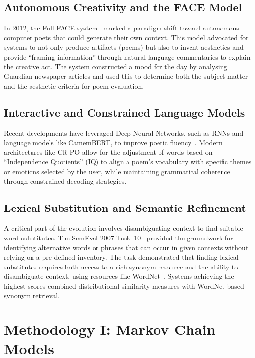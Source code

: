 \documentclass[conference]{IEEEtran}
\begin{document}
\subsection{Autonomous Creativity and the FACE Model}
In 2012, the Full-FACE system~\cite{colton2012face} marked a paradigm shift toward autonomous computer poets that could generate their own context. This model advocated for systems to not only produce artifacts (poems) but also to invent aesthetics and provide ``framing information'' through natural language commentaries to explain the creative act. The system constructed a mood for the day by analysing Guardian newspaper articles and used this to determine both the subject matter and the aesthetic criteria for poem evaluation.

\subsection{Interactive and Constrained Language Models}
Recent developments have leveraged Deep Neural Networks, such as RNNs and language models like CamemBERT, to improve poetic fluency~\cite{popescu2022crpo}. Modern architectures like CR-PO allow for the adjustment of words based on ``Independence Quotients'' (IQ) to align a poem's vocabulary with specific themes or emotions selected by the user, while maintaining grammatical coherence through constrained decoding strategies.

\subsection{Lexical Substitution and Semantic Refinement}
A critical part of the evolution involves disambiguating context to find suitable word substitutes. The SemEval-2007 Task~10~\cite{mccarthy2007semeval} provided the groundwork for identifying alternative words or phrases that can occur in given contexts without relying on a pre-defined inventory. The task demonstrated that finding lexical substitutes requires both access to a rich synonym resource and the ability to disambiguate context, using resources like WordNet~\cite{miller1993wordnet}. Systems achieving the highest scores combined distributional similarity measures with WordNet-based synonym retrieval.


\section{Methodology I: Markov Chain Models}
\label{sec:markov}
\end{document}
